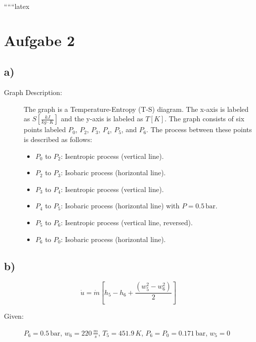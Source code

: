 
``````latex


\section*{Aufgabe 2}

\subsection*{a)}

\begin{description}
    \item[Graph Description:] The graph is a Temperature-Entropy (T-S) diagram. The x-axis is labeled as $S \left[ \frac{kJ}{kg \cdot K} \right]$ and the y-axis is labeled as $T \left[ K \right]$. The graph consists of six points labeled $P_0$, $P_2$, $P_3$, $P_4$, $P_5$, and $P_6$. The process between these points is described as follows:
    \begin{itemize}
        \item $P_0$ to $P_2$: Isentropic process (vertical line).
        \item $P_2$ to $P_3$: Isobaric process (horizontal line).
        \item $P_3$ to $P_4$: Isentropic process (vertical line).
        \item $P_4$ to $P_5$: Isobaric process (horizontal line) with $P = 0.5 \, \text{bar}$.
        \item $P_5$ to $P_6$: Isentropic process (vertical line, reversed).
        \item $P_6$ to $P_0$: Isobaric process (horizontal line).
    \end{itemize}
\end{description}

\subsection*{b)}

\begin{equation*}
    \dot{u} = \dot{m} \left[ h_5 - h_6 + \frac{(w_5^2 - w_6^2)}{2} \right]
\end{equation*}

\begin{description}
    \item[Given:] $P_6 = 0.5 \, \text{bar}$, $w_6 = 220 \, \frac{m}{s}$, $T_5 = 451.9 \, K$, $P_6 = P_0 = 0.171 \, \text{bar}$, $w_5 = 0$
\end{description}

